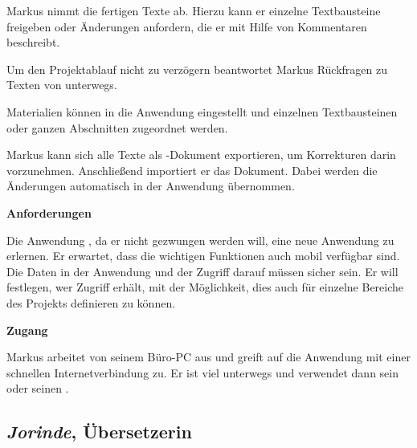 \begin{multicols}{2}
Markus nimmt die fertigen Texte ab. Hierzu kann er einzelne Textbausteine freigeben oder Änderungen anfordern, die er mit Hilfe von Kommentaren beschreibt. 

Um den Projektablauf nicht zu verzögern beantwortet Markus Rückfragen zu Texten von unterwegs.

Materialien können in die Anwendung eingestellt und einzelnen Textbausteinen oder ganzen Abschnitten zugeordnet werden.

Markus kann sich alle Texte als -Dokument exportieren, um Korrekturen darin vorzunehmen. Anschließend importiert er das Dokument. Dabei werden die Änderungen automatisch in der Anwendung übernommen.

\textbf{Anforderungen}

Die Anwendung , da er nicht gezwungen werden will, eine neue Anwendung zu erlernen. Er erwartet, dass die wichtigen Funktionen auch mobil verfügbar sind. Die Daten in der Anwendung und der Zugriff darauf müssen sicher sein. Er will festlegen, wer Zugriff erhält, mit der Möglichkeit, dies auch für einzelne Bereiche des Projekts definieren zu können.

\textbf{Zugang}

Markus arbeitet von seinem Büro-PC aus und greift auf die Anwendung mit einer schnellen Internetverbindung zu. Er ist viel unterwegs und verwendet dann sein  oder seinen .

\end{multicols}

\pagebreak

\subsection{\emph{Jorinde}, Übersetzerin}\label{p:jorinde}


